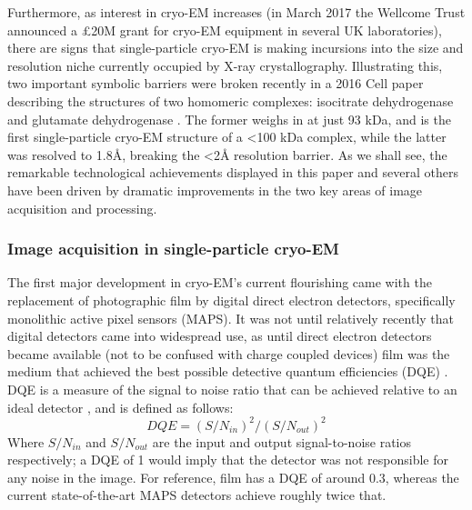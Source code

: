 \documentclass[a4paper,11pt,twoside,openright]{scrbook}
\begin{document}
Furthermore, as interest in cryo-EM increases (in March 2017 the Wellcome Trust announced a £20M grant for cryo-EM equipment in several UK laboratories), there are signs that single-particle cryo-EM is making incursions into the size and resolution niche currently occupied by X-ray crystallography. Illustrating this, two important symbolic barriers were broken recently in a 2016 Cell paper describing the structures of two homomeric complexes: isocitrate dehydrogenase and glutamate dehydrogenase \cite{Merk2016}. The former weighs in at just 93 kDa, and is the first single-particle cryo-EM structure of a <100 kDa complex, while the latter was resolved to 1.8Å, breaking the <2Å resolution barrier. As we shall see, the remarkable technological achievements displayed in this paper and several others have been driven by dramatic improvements in the two key areas of image acquisition and processing\cite{Bai2015}.

\subsubsection{Image acquisition in single-particle cryo-EM}
The first major development in cryo-EM's current flourishing came with the replacement of photographic film by digital direct electron detectors, specifically monolithic active pixel sensors (MAPS). It was not until relatively recently that digital detectors came into widespread use, as until direct electron detectors became available (not to be confused with charge coupled devices) film was the medium that achieved the best possible detective quantum efficiencies (DQE) \cite{McMullan2009}. DQE is a measure of the signal to noise ratio that can be achieved relative to an ideal detector \cite{Dainty1975}, and is defined as follows:
\begin{displaymath}
    DQE = (S/N_{in})^{2}/(S/N_{out})^{2}
\end{displaymath}
Where \begin{math} S/N_{in} \end{math} and \begin{math} S/N_{out} \end{math} are the input and output signal-to-noise ratios respectively; a DQE of 1 would imply that the detector was not responsible for any noise in the image. For reference, film has a DQE of around 0.3, whereas the current state-of-the-art MAPS detectors achieve roughly twice that.
\end{document}
